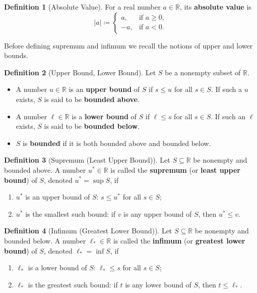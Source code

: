 \documentclass[12pt,a4paper]{article}
\theoremstyle{definition}
\newtheorem*{definition}{Definition}
\newcommand{\R}{\mathbb{R}}
\newcommand{\abs}[1]{\left\lvert#1\right\rvert}
\begin{document}
\begin{definition}[Absolute Value]
For a real number \(a\in\R\), its \textbf{absolute value} is
\[
    \abs{a} \coloneqq \begin{cases}
        a, & \text{if } a\ge 0,\\
        -a, & \text{if } a<0.
    \end{cases}
\]
\end{definition}

Before defining supremum and infimum we recall the notions of upper and lower bounds.

\begin{definition}[Upper Bound, Lower Bound]
Let \(S\) be a nonempty subset of \(\R\).
\begin{itemize}
    \item A number \(u\in\R\) is an \textbf{upper bound} of \(S\) if \(s\le u\) for all \(s\in S\).  
          If such a \(u\) exists, \(S\) is said to be \textbf{bounded above}.
    \item A number \(\ell\in\R\) is a \textbf{lower bound} of \(S\) if \(\ell\le s\) for all \(s\in S\).  
          If such an \(\ell\) exists, \(S\) is said to be \textbf{bounded below}.
    \item \(S\) is \textbf{bounded} if it is both bounded above and bounded below.
\end{itemize}
\end{definition}

\begin{definition}[Supremum (Least Upper Bound)]
Let \(S\subseteq\R\) be nonempty and bounded above. A number \(u^*\in\R\) is called the \textbf{supremum} (or \textbf{least upper bound}) of \(S\), denoted \(u^*=\sup S\), if
\begin{enumerate}[label=(\roman*)]
    \item \(u^*\) is an upper bound of \(S\): \(s\le u^*\) for all \(s\in S\);
    \item \(u^*\) is the smallest such bound: if \(v\) is any upper bound of \(S\), then \(u^*\le v\).
\end{enumerate}
\end{definition}

\begin{definition}[Infimum (Greatest Lower Bound)]
Let \(S\subseteq\R\) be nonempty and bounded below. A number \(\ell_*\in\R\) is called the \textbf{infimum} (or \textbf{greatest lower bound}) of \(S\), denoted \(\ell_*=\inf S\), if
\begin{enumerate}[label=(\roman*)]
    \item \(\ell_*\) is a lower bound of \(S\): \(\ell_*\le s\) for all \(s\in S\);
    \item \(\ell_*\) is the greatest such bound: if \(t\) is any lower bound of \(S\), then \(t\le \ell_*\).
\end{enumerate}
\end{definition}
\end{document}
